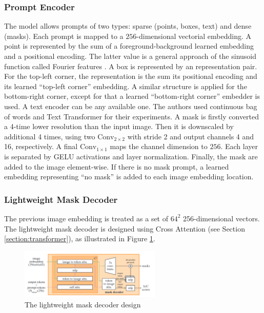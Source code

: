 \subsubsection{Prompt Encoder}
The model allows prompts of two types: sparse (points, boxes, text) and dense (masks). Each prompt is mapped to a $256$-dimensional vectorial embedding. A point is represented by the sum of a foreground-background learned embedding and a positional encoding. The latter value is a general approach of the sinusoid function called Fourier features \cite{tancik2020fourier}. A box is represented by an representation pair. For the top-left corner, the representation is the sum its positional encoding and its learned ``top-left corner'' embedding. A similar structure is applied for the bottom-right corner, except for that a learned ``bottom-right corner'' embedder is used. A text encoder can be any available one. The authors used continuous bag of words and Text Transformer \cite{vaswani2017attention} for their experiments. A mask is firstly converted a 4-time lower resolution than the input image. Then it is downscaled  by additional 4 times, using two $\mathrm{Conv}_{2\times 2}$ with stride 2 and output channels 4 and 16, respectively. A final $\mathrm{Conv}_{1\times 1}$ maps the channel dimension to $256$. Each layer is separated by GELU activations and layer normalization. Finally, the mask are added to the image element-wise. If there is no mask prompt, a learned embedding representing ``no mask'' is added to each image embedding location.

\subsubsection{Lightweight Mask Decoder}
The previous image embedding is treated as a set of $64^2$ 256-dimensional vectors. The lightweight mask decoder is designed using Cross Attention (see Section \ref{section:transformer}), as illustrated in Figure \ref{figure:segment-anything-model-mask-decoder}.

\begin{figure}[ht]
  \centering
  \includegraphics[width=0.6\textwidth]{img/segment-anything-model-mask-decoder.png}
  \vspace{0.25cm}
  \caption[The lightweight mask decoder design]{The lightweight mask decoder design \cite{kirillov2023segment}}
  \label{figure:segment-anything-model-mask-decoder}
\end{figure}


